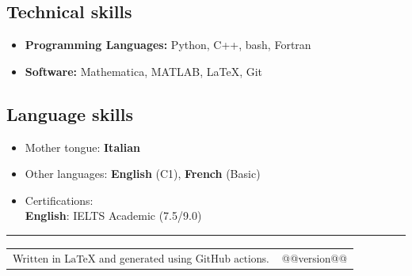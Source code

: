 \documentclass[10pt,a4paper]{article}
\makeatletter
\newcommand{\headerrow}[2]
{\begin{tabular*}{\linewidth}{l@{\extracolsep{\fill}}r}
	#1 &
	#2 \\
\end{tabular*}}
\makeatother
\begin{document}
\subsection*{Technical skills}
\begin{itemize}[leftmargin=1em]
  \item[] \textbf{Programming Languages:} Python, C++, bash, Fortran
  \item[] \textbf{Software:} Mathematica, MATLAB, \LaTeX, Git
\end{itemize}

\subsection*{Language skills}
\begin{itemize}[leftmargin=1em]
  \item[] Mother tongue: \textbf{Italian}
  \item[] Other languages: \textbf{English} (C1), \textbf{French} (Basic)
  \item[] Certifications:\\ 
  \textbf{English}: IELTS Academic (7.5/9.0)
\end{itemize}

\vfill
\hrule
\begin{description}
  \item
\headerrow
  {{\textsubscript{Written in {\LaTeX} and generated using GitHub actions.}}}
  {{\textsubscript{@@version@@}}}
\end{description}
\end{document}
